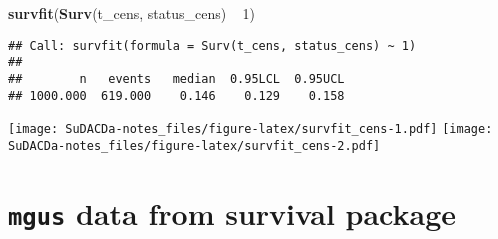 \documentclass[]{book}
\newenvironment{Shaded}{\begin{snugshade}}{\end{snugshade}}
\newcommand{\KeywordTok}[1]{\textcolor[rgb]{0.13,0.29,0.53}{\textbf{{#1}}}}
\newcommand{\DataTypeTok}[1]{\textcolor[rgb]{0.13,0.29,0.53}{{#1}}}
\newcommand{\DecValTok}[1]{\textcolor[rgb]{0.00,0.00,0.81}{{#1}}}
\newcommand{\FloatTok}[1]{\textcolor[rgb]{0.00,0.00,0.81}{{#1}}}
\newcommand{\StringTok}[1]{\textcolor[rgb]{0.31,0.60,0.02}{{#1}}}
\newcommand{\OtherTok}[1]{\textcolor[rgb]{0.56,0.35,0.01}{{#1}}}
\newcommand{\NormalTok}[1]{{#1}}
\theoremstyle{definition}
\theoremstyle{definition}
\theoremstyle{definition}
\theoremstyle{remark}
\begin{document}
\begin{Shaded}
\begin{Highlighting}[]
\KeywordTok{survfit}\NormalTok{(}\KeywordTok{Surv}\NormalTok{(t_cens, status_cens) ~}\StringTok{ }\DecValTok{1}\NormalTok{)}
\end{Highlighting}
\end{Shaded}

\begin{verbatim}
## Call: survfit(formula = Surv(t_cens, status_cens) ~ 1)
## 
##        n   events   median  0.95LCL  0.95UCL 
## 1000.000  619.000    0.146    0.129    0.158
\end{verbatim}

\begin{Shaded}
\end{Shaded}

\texttt{[image: SuDACDa-notes\_files/figure-latex/survfit\_cens-1.pdf]}
\texttt{[image: SuDACDa-notes\_files/figure-latex/survfit\_cens-2.pdf]}

\section{\texorpdfstring{\texttt{mgus} data from \textbf{survival}
package}{mgus data from survival package}}\label{mgus-data-from-survival-package}
\end{document}
